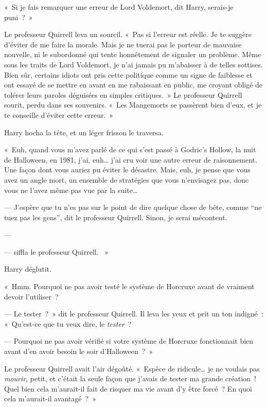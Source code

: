 «~Si je fais remarquer une erreur de Lord Voldemort, dit Harry, serais-je puni~?~»

Le professeur Quirrell leva un sourcil. «~Pas si l'erreur est réelle. Je te suggère d'éviter de me faire la morale. Mais je ne tuerai pas le porteur de mauvaise nouvelle, ni le subordonné qui tente honnêtement de signaler un problème. Même sous les traits de Lord Voldemort, je n'ai jamais pu m'abaisser à de telles sottises. Bien sûr, certains idiots ont pris cette politique comme un signe de faiblesse et ont essayé de se mettre en avant en me rabaissant en public, me croyant obligé de tolérer leurs paroles déguisées en simples critiques.~» Le professeur Quirrell sourit, perdu dans ses souvenirs. «~Les Mangemorts se passèrent bien d'eux, et je te conseille d'éviter cette erreur.~»

Harry hocha la tête, et un léger frisson le traversa.

«~Euh, quand vous m'avez parlé de ce qui s'est passé à Godric's Hollow, la nuit de Halloween, en 1981, j'ai, euh… j'ai cru voir une autre erreur de raisonnement. Une façon dont vous auriez pu éviter le désastre. Mais, euh, je pense que vous avez un angle mort, un ensemble de stratégies que vous n'envisagez pas, donc vous ne l'avez même pas vue par la suite…

--- J'espère que tu n'es pas sur le point de dire quelque chose de bête, comme “ne tuez pas les gens”, dit le professeur Quirrell. Sinon, je serai mécontent.

--- 

---  siffla le professeur Quirrell. ~»

Harry déglutit.

«~Hmm. Pourquoi ne pas avoir testé le système de Horcruxe avant de vraiment devoir l'utiliser~?

--- Le tester~?~» dit le professeur Quirrell. Il leva les yeux et prit un ton indigné~: «~Qu'est-ce que tu veux dire, le \emph{tester}~?

--- Pourquoi ne pas avoir vérifié si votre système de Horcruxe fonctionnait bien avant d'en avoir besoin le soir d'Halloween~?~»

Le professeur Quirrell avait l'air dégoûté. «~Espèce de ridicule… je ne voulais pas \emph{mourir}, petit, et c'était la seule façon que j'avais de tester ma grande création~! Quel bien cela m'aurait-il fait de risquer ma vie avant d'y être forcé~? En quoi cela m'aurait-il avantagé~?~»

